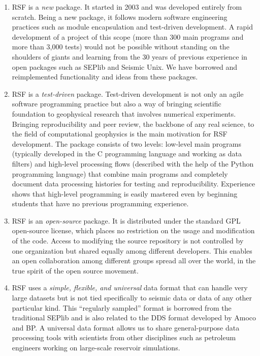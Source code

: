 \begin{enumerate}

\item RSF is a \emph{new} package. It started in 2003 and was
developed entirely from scratch. Being a new package, it follows
modern software engineering practices such as module encapsulation and
test-driven development. A rapid development of a project of this
scope (more than 300 main programs and more than 3,000 tests) would not
be possible without standing on the shoulders of giants and learning
from the 30 years of previous experience in open packages such as
SEPlib and Seismic Unix. We have borrowed and reimplemented
functionality and ideas from these packages.

\item RSF is a \emph{test-driven} package. Test-driven development is
not only an agile software programming practice but also a way of
bringing scientific foundation to geophysical research that involves
numerical experiments. Bringing reproducibility and peer review, the
backbone of any real science, to the field of computational geophysics
is the main motivation for RSF development. The package consists of
two levels: low-level main programs (typically developed in the C
programming language and working as data filters) and high-level
processing flows (described with the help of the Python programming
language) that combine main programs and completely document data
processing histories for testing and reproducibility. Experience
shows that high-level programming is easily mastered even by beginning
students that have no previous programming experience.

\item RSF is an \emph{open-source} package. It is distributed under
the standard GPL open-source license, which places no restriction on
the usage and modification of the code. Access to modifying the source
repository is not controlled by one organization but shared equally
among different developers. This enables an open collaboration among
different groups spread all over the world, in the true spirit of the
open source movement.

\item RSF uses a \emph{simple, flexible, and universal} data format
that can handle very large datasets but is not tied specifically to
seismic data or data of any other particular kind. This ``regularly
sampled'' format is borrowed from the traditional SEPlib and is also
related to the DDS format developed by Amoco and BP. A universal data
format allows us to share general-purpose data processing tools with
scientists from other disciplines such as petroleum engineers working
on large-scale reservoir simulations.

\end{enumerate}

